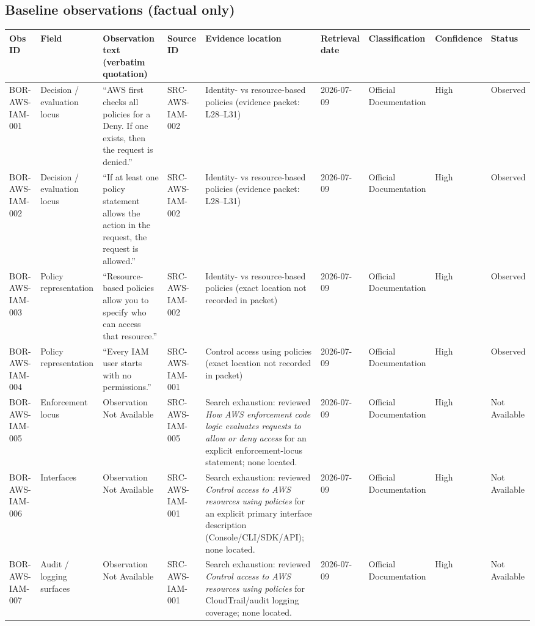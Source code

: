 \documentclass[11pt]{article}
\begin{document}
\subsection*{Baseline observations (factual only)}
\begin{longtable}{@{}L{1.0in}L{1.1in}L{2.15in}L{1.1in}L{1.25in}L{0.75in}L{0.95in}L{0.75in}L{0.8in}@{}}
\toprule
Obs ID & Field & Observation text (verbatim quotation) & Source ID & Evidence location & Retrieval date & Classification & Confidence & Status\\
\midrule
\endhead
BOR-AWS-IAM-001 & Decision / evaluation locus & ``AWS first checks all policies for a Deny. If one exists, then the request is denied.'' & SRC-AWS-IAM-002 & Identity- vs resource-based policies (evidence packet: L28--L31) & 2026-07-09 & Official Documentation & High & Observed\\
BOR-AWS-IAM-002 & Decision / evaluation locus & ``If at least one policy statement allows the action in the request, the request is allowed.'' & SRC-AWS-IAM-002 & Identity- vs resource-based policies (evidence packet: L28--L31) & 2026-07-09 & Official Documentation & High & Observed\\
BOR-AWS-IAM-003 & Policy representation & ``Resource-based policies allow you to specify who can access that resource.'' & SRC-AWS-IAM-002 & Identity- vs resource-based policies (exact location not recorded in packet) & 2026-07-09 & Official Documentation & High & Observed\\
BOR-AWS-IAM-004 & Policy representation & ``Every IAM user starts with no permissions.'' & SRC-AWS-IAM-001 & Control access using policies (exact location not recorded in packet) & 2026-07-09 & Official Documentation & High & Observed\\
BOR-AWS-IAM-005 & Enforcement locus & Observation Not Available & SRC-AWS-IAM-005 & Search exhaustion: reviewed \textit{How AWS enforcement code logic evaluates requests to allow or deny access} for an explicit enforcement-locus statement; none located. & 2026-07-09 & Official Documentation & High & Not Available\\
BOR-AWS-IAM-006 & Interfaces & Observation Not Available & SRC-AWS-IAM-001 & Search exhaustion: reviewed \textit{Control access to AWS resources using policies} for an explicit primary interface description (Console/CLI/SDK/API); none located. & 2026-07-09 & Official Documentation & High & Not Available\\
BOR-AWS-IAM-007 & Audit / logging surfaces & Observation Not Available & SRC-AWS-IAM-001 & Search exhaustion: reviewed \textit{Control access to AWS resources using policies} for CloudTrail/audit logging coverage; none located. & 2026-07-09 & Official Documentation & High & Not Available\\
\bottomrule
\end{longtable}
\end{document}
